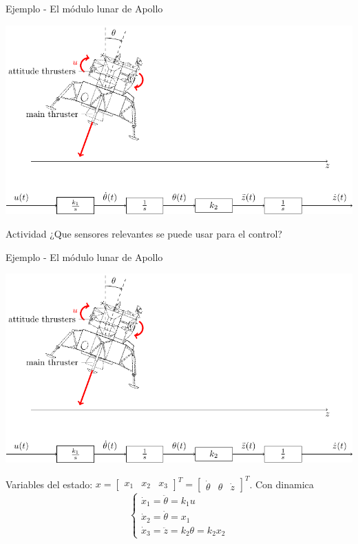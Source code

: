 \documentclass[presentation,aspectratio=1610]{beamer}
\begin{document}
\begin{frame}[label={sec:orgd5dbd7f}]{Ejemplo - El módulo lunar de Apollo}
\begin{center}
\includegraphics[width=0.8\linewidth]{fig-apollo}
\end{center}
\alert{Actividad} ¿Que sensores relevantes se puede usar para el control?
\end{frame}

\begin{frame}[label={sec:orgd8e1e4b}]{Ejemplo - El módulo lunar de Apollo}
\begin{center}
\includegraphics[width=0.7\linewidth]{fig-apollo}
\end{center}

Variables del estado: \(x = \begin{bmatrix} x_1 & x_2 & x_3 \end{bmatrix}^T = \begin{bmatrix} \dot{\theta} & \theta & \dot{z} \end{bmatrix}^T\). Con dinamica
\[ \begin{cases} \dot{x}_1 =  \ddot{\theta} = k_1 u\\ \dot{x}_2 = \dot{\theta} = x_1\\ \dot{x}_3 = \ddot{z} = k_2\theta = k_2x_2 \end{cases} \]
\end{frame}
\end{document}
